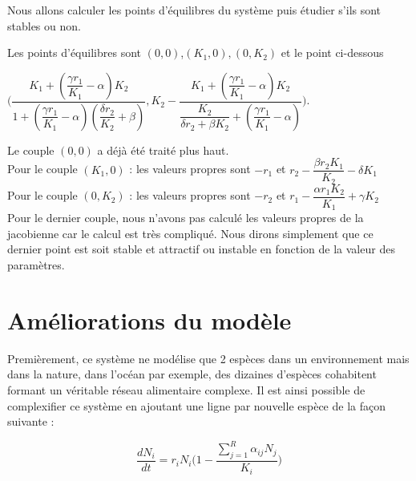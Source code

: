 \documentclass[11pt]{article}
\begin{document}
Nous allons calculer les points d'équilibres du système puis étudier s'ils sont stables ou non.
\newline

Les points d'équilibres sont $(0,0)$,$(K_1,0),(0,K_2)$ et le point ci-dessous
\begin{center}
$\Bigg(\dfrac{K_{1}+(\dfrac{\gamma r_{1}}{K_{1}}-\alpha)K_{2}}{1+(\dfrac{\gamma r_{1}}{K_{1}}-\alpha)(\dfrac{\delta r_{2}}{K_{2}}+\beta)},
K_{2}-\dfrac{K_{1}+(\dfrac{\gamma r_{1}}{K_{1}}-\alpha)K_{2}}{\dfrac{K_{2}}{\delta r_{2}+\beta K_{2}}+(\dfrac{\gamma r_{1}}{K_{1}}-\alpha)}\Bigg)$.
\end{center}
Le couple $(0,0)$ a déjà été traité plus haut.\\

Pour le couple $(K_1,0)$ : les valeurs propres sont $-r_{1}$ et $r_{2}-\dfrac{\beta r_{2}K_{1}}{K_{2}}-\delta K_{1}$\\

Pour le couple $(0,K_{2})$ : les valeurs propres sont $-r_{2}$ et $r_{1}-\dfrac{\alpha r_{1}K_{2}}{K_{1}}+\gamma K_{2}$\\


Pour le dernier couple, nous n'avons pas calculé les valeurs propres de la jacobienne car le calcul est très compliqué. Nous dirons simplement que ce dernier point est soit stable et attractif ou instable en fonction de la valeur des paramètres.



\section{Améliorations du modèle}
Premièrement, ce système ne modélise que 2 espèces dans un environnement mais dans la nature, dans l'océan par exemple, des dizaines d'espèces cohabitent formant un véritable réseau alimentaire complexe. Il est ainsi possible de complexifier ce système en ajoutant une ligne par nouvelle espèce de la façon suivante : 
\begin{center}
\[ \dfrac{dN_i}{dt} = r_iN_i\Big(1 - \dfrac{\sum\limits_{j=1}^R \alpha_{ij}N_j}{K_i}\Big) \]
\end{center}
\end{document}
